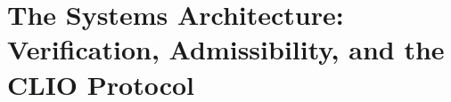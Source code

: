 \documentclass[11pt,twoside]{book}
\begin{document}
\frontmatter
\tableofcontents

\mainmatter
\part{The Systems Architecture: Verification, Admissibility, and the CLIO Protocol}






\backmatter
\appendix


\end{document}
